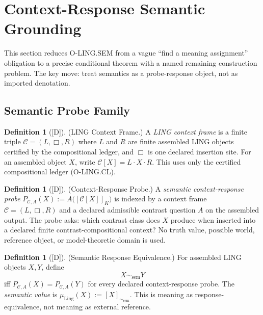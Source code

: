 \documentclass[12pt,oneside]{amsbook}
\theoremstyle{plain}
\theoremstyle{definition}
\newtheorem{definition}[theorem]{Definition}
\theoremstyle{remark}
\newcommand{\status}[1]{\textup{[#1]}}
\begin{document}
\section{Context-Response Semantic Grounding}\label{sec:ling-SEM-discharge}

This section reduces O-LING.SEM from a vague ``find a meaning
assignment'' obligation to a precise conditional theorem with a named
remaining construction problem. The key move: treat semantics as
a probe-response object, not as imported denotation.

\subsection{Semantic Probe Family}\label{sec:ling-SEM-probes}

\begin{definition}[\status{D}]\label{def:ling-context-frame}
\textup{(LING Context Frame.)}
A \emph{LING context frame} is a finite triple
$\mathcal{C} = (L, \Box, R)$
where $L$ and $R$ are finite assembled LING objects certified by the
compositional ledger, and $\Box$ is one declared insertion site. For
an assembled object $X$, write $\mathcal{C}[X] = L \cdot X \cdot R$.
This uses only the certified compositional ledger (O-LING.CL).
\end{definition}

\begin{definition}[\status{D}]\label{def:ling-context-response-probe}
\textup{(Context-Response Probe.)}
A \emph{semantic context-response probe}
$P_{\mathcal{C},A}(X) := A\bigl([\mathcal{C}[X]]_K\bigr)$
is indexed by a context frame $\mathcal{C} = (L,\Box,R)$ and a
declared admissible contrast question $A$ on the assembled output.
The probe asks: which contrast class does $X$ produce when inserted
into a declared finite contrast-compositional context? No truth
value, possible world, reference object, or model-theoretic domain
is used.
\end{definition}

\begin{definition}[\status{D}]\label{def:ling-sem-response-equivalence}
\textup{(Semantic Response Equivalence.)}
For assembled LING objects $X, Y$, define
\[
 X \sim_{\mathrm{sem}} Y
\]
iff $P_{\mathcal{C},A}(X) = P_{\mathcal{C},A}(Y)$ for every declared
context-response probe. The \emph{semantic value} is
$\mu_{\mathrm{Ling}}(X) := [X]_{\sim_{\mathrm{sem}}}$. This is
meaning as response-equivalence, not meaning as external reference.
\end{definition}
\end{document}
